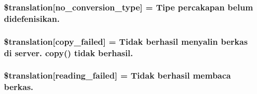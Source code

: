 \subsubsection[{\$translation}]{\setlength{\rightskip}{0pt plus 5cm}\$translation\mbox{[}\textquotesingle{}no\+\_\+conversion\+\_\+type\textquotesingle{}\mbox{]} = \textquotesingle{}Tipe percakapan belum didefenisikan.\textquotesingle{}}\label{class_8upload_8id___i_d_8php_a4712d7ec28e9a7f17eb3338af2358363}
\hypertarget{class_8upload_8id___i_d_8php_a783c9358bcf54a054545b50098bc679b}{}
\subsubsection[{\$translation}]{\setlength{\rightskip}{0pt plus 5cm}\$translation\mbox{[}\textquotesingle{}copy\+\_\+failed\textquotesingle{}\mbox{]} = \textquotesingle{}Tidak berhasil menyalin berkas di server. copy() tidak berhasil.\textquotesingle{}}\label{class_8upload_8id___i_d_8php_a783c9358bcf54a054545b50098bc679b}
\hypertarget{class_8upload_8id___i_d_8php_a01bea14c9fd5f353f62db44beabfcd42}{}
\subsubsection[{\$translation}]{\setlength{\rightskip}{0pt plus 5cm}\$translation\mbox{[}\textquotesingle{}reading\+\_\+failed\textquotesingle{}\mbox{]} = \textquotesingle{}Tidak berhasil membaca berkas.\textquotesingle{}}\label{class_8upload_8id___i_d_8php_a01bea14c9fd5f353f62db44beabfcd42}
